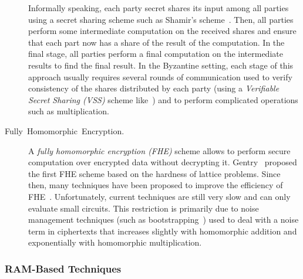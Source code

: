 \documentclass[10pt]{article}
\theoremstyle{plain}
\begin{document}
\begin{description}
	Informally speaking, each party secret shares its input among all
	parties using a secret sharing scheme such as Shamir's scheme~\cite{shamir:how}.
	Then, all parties perform some intermediate computation on the received
	shares and ensure that each part now has a share of the result of
	the computation. In the final stage, all parties perform a final computation
	on the intermediate results to find the final result. In the Byzantine
	setting, each stage of this approach usually requires several rounds
	of communication used to verify consistency of the shares distributed
	by each party (using a \emph{Verifiable Secret Sharing (VSS)} scheme
	like~\cite{Chor:1985:VSS:1382438.1382871,bgw88}) and to perform
	complicated operations such as multiplication.
	\item [{Fully~Homomorphic~Encryption.}] A \emph{fully homomorphic encryption
		(FHE)} scheme allows to perform secure computation over encrypted
	data without decrypting it. Gentry~\cite{Gentry:2009:FHE:1536414.1536440}
	proposed the first FHE scheme based on the hardness of lattice problems.
	Since then, many techniques have been proposed to improve the efficiency
	of FHE~\cite{vanDijk:2010:FHE:2163822.2163825,Brakerski:2012:FHE:2090236.2090262,Gentry:2012:FHE:2260849.2260887}.
	Unfortunately, current techniques are still very slow and can only
	evaluate small circuits. This restriction is primarily due to noise
	management techniques (such as bootstrapping~\cite{Gentry:2009:FHE:1536414.1536440})
	used to deal with a noise term in ciphertexts that increases slightly
	with homomorphic addition and exponentially with homomorphic multiplication.
\end{description}

\subsubsection{RAM-Based Techniques}
\end{document}
